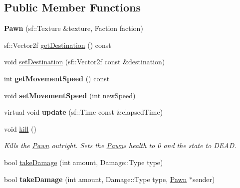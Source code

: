 \subsection*{Public Member Functions}
\begin{DoxyCompactItemize}
\item 
\hypertarget{class_pawn_a0e5a39bb4a43ba3ce8848b2e9055c5b0}{}{\bfseries Pawn} (sf\+::\+Texture \&texture, Faction faction)\label{class_pawn_a0e5a39bb4a43ba3ce8848b2e9055c5b0}

\item 
sf\+::\+Vector2f \hyperlink{class_pawn_a27c4b05b5e5dc303d5c9a838cc96a7cf}{get\+Destination} () const 
\item 
void \hyperlink{class_pawn_a866b60201664eb6a0c743afa13ee5ccb}{set\+Destination} (sf\+::\+Vector2f const \&destination)
\item 
\hypertarget{class_pawn_a757e87fbd789d00549e38c1eaa17f0c4}{}int {\bfseries get\+Movement\+Speed} () const \label{class_pawn_a757e87fbd789d00549e38c1eaa17f0c4}

\item 
\hypertarget{class_pawn_a37f3801cb4e6100ab126d438f2abe786}{}void {\bfseries set\+Movement\+Speed} (int new\+Speed)\label{class_pawn_a37f3801cb4e6100ab126d438f2abe786}

\item 
\hypertarget{class_pawn_a36bf19ac850570a5e82142e01d3aab67}{}virtual void {\bfseries update} (sf\+::\+Time const \&elapsed\+Time)\label{class_pawn_a36bf19ac850570a5e82142e01d3aab67}

\item 
\hypertarget{class_pawn_a28ab485f127ce43f33c026300283c546}{}void \hyperlink{class_pawn_a28ab485f127ce43f33c026300283c546}{kill} ()\label{class_pawn_a28ab485f127ce43f33c026300283c546}

\begin{DoxyCompactList}\small\item\em Kills the \hyperlink{class_pawn}{Pawn} outright. Sets the \hyperlink{class_pawn}{Pawn}\textquotesingle{}s health to 0 and the state to D\+E\+A\+D. \end{DoxyCompactList}\item 
bool \hyperlink{class_pawn_a33dbdacc56d2f0728d7485b508b6d28e}{take\+Damage} (int amount, Damage\+::\+Type type)
\item 
\hypertarget{class_pawn_a3fe30c95134f87a7b91e3113b7c2c78b}{}bool {\bfseries take\+Damage} (int amount, Damage\+::\+Type type, \hyperlink{class_pawn}{Pawn} $\ast$sender)\label{class_pawn_a3fe30c95134f87a7b91e3113b7c2c78b}


\end{DoxyCompactItemize}

